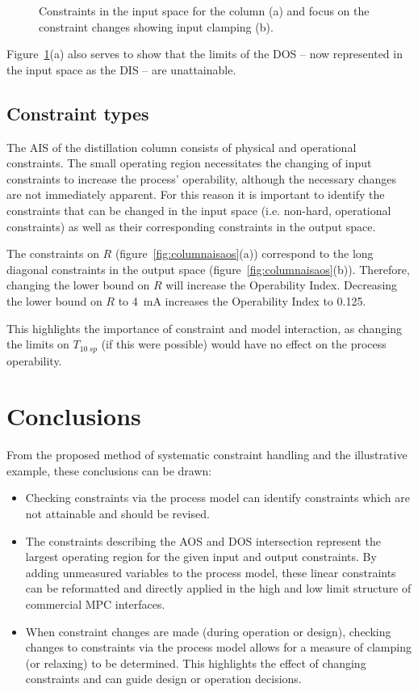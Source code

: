 \documentclass[final,authoryear,5pt,times,twocolumn]{elsarticle}
\begin{document}
\begin{figure}[htbp]
  \centering
    \scalebox{1}{}
    \scalebox{1}{}
  \caption{Constraints in the input space for the column (a) and focus on the constraint changes showing input clamping (b).}
  \label{fig:columnconsinput}
\end{figure}

Figure~\ref{fig:columnconsinput}(a) also serves to show that the limits of the DOS -- now represented in the input space as the DIS -- are unattainable.

\subsection{Constraint types}
The AIS of the distillation column consists of physical and operational constraints.
The small operating region necessitates the changing of input constraints to increase the process' operability, although the necessary changes are not immediately apparent.
For this reason it is important to identify the constraints that can be changed in the input space (i.e. non-hard, operational constraints) as well as their corresponding constraints in the output space.

The constraints on $R$ (figure~\ref{fig:columnaisaos}(a)) correspond to the long diagonal constraints in the output space (figure~\ref{fig:columnaisaos}(b)).
Therefore, changing the lower bound on $R$ will increase the Operability Index.
Decreasing the lower bound on $R$ to 4~mA increases the Operability Index to 0.125.

This highlights the importance of constraint and model interaction, as changing the limits on $T_{10~sp}$ (if this were possible) would have no effect on the process operability.


\section{Conclusions}\label{sec:conclusions}
From the proposed method of systematic constraint handling and the illustrative example, these conclusions can be drawn:
\begin{itemize}
  \item Checking constraints via the process model can identify constraints which are not attainable and should be revised.
  \item The constraints describing the AOS and DOS intersection represent the largest operating region for the given input and output constraints.
By adding unmeasured variables to the process model, these linear constraints can be reformatted and directly applied in the high and low limit structure of commercial MPC interfaces.
  \item When constraint changes are made (during operation or design), checking changes to constraints via the process model allows for a measure of clamping (or relaxing) to be determined.
This highlights the effect of changing constraints and can guide design or operation decisions.
\end{itemize}
\end{document}
